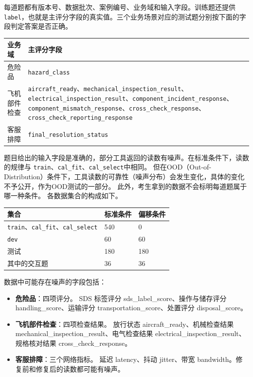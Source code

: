 \documentclass[11pt,a4paper]{article}
\newcounter{none} %
\begin{document}
每道题都有版本号、数据批次、案例编号、业务域和输入字段。训练题还提供\texttt{label}，也就是主评分字段的真实值。三个业务场景对应的测试题分别按下面的字段判定答案是否正确。

{\small{} %
\begin{longtable}[]{@{}
  >{\raggedright\arraybackslash}p{}
  >{\raggedright\arraybackslash}p{}@{}}
\toprule\noalign{}
\begin{minipage}[b]{\linewidth}\raggedright
业务域
\end{minipage} & \begin{minipage}[b]{\linewidth}\raggedright
主评分字段
\end{minipage} \\
\midrule\noalign{}
\endhead
\bottomrule\noalign{}
\endlastfoot
危险品 & \texttt{hazard\_class} \\
飞机部件检查 &
\texttt{aircraft\_ready}、\texttt{mechanical\_inspection\_result}、\texttt{electrical\_inspection\_result}、\texttt{component\_incident\_response}、\texttt{component\_mismatch\_response}、\texttt{cross\_check\_response}、\texttt{cross\_check\_reporting\_response} \\
客服排障 & \texttt{final\_resolution\_status} \\
\end{longtable}
}

题目给出的输入字段是准确的，部分工具返回的读数有噪声。在标准条件下，读数的规律与
\texttt{train}、\texttt{cal\_fit}、\texttt{cal\_select}中相同。
但在OOD（Out-of-Distribution）条件下，工具读数的可靠性（噪声分布）会发生变化，具体的变化不予公开，作为OOD测试的一部分。
此外，考生拿到的数据不会标明每道题属于哪一种条件。
各数据集合的构成如下。

{\small{} %
\begin{longtable}[]{@{}lll@{}}
\toprule\noalign{}
集合 & 标准条件 & 偏移条件 \\
\midrule\noalign{}
\endhead
\bottomrule\noalign{}
\endlastfoot
\texttt{train}、\texttt{cal\_fit}、\texttt{cal\_select} & 540 & 0 \\
\texttt{dev} & 60 & 60 \\
测试 & 180 & 180 \\
其中的交互题 & 36 & 36 \\
\end{longtable}
}

数据中可能存在噪声的字段包括：
\begin{itemize}
\item \textbf{危险品}：四项评分。 SDS 标签评分 sds\_label\_score、操作与储存评分 handling\_score、运输评分 transportation\_score、处置评分 disposal\_score。
\item \textbf{飞机部件检查}：四项检查结果。 放行状态 aircraft\_ready、机械检查结果 mechanical\_inspection\_result、电气检查结果 electrical\_inspection\_result、规格核对结果 cross\_check\_response。
\item \textbf{客服排障}：三个网络指标。 延迟 latency、抖动 jitter、带宽 bandwidth。修复前和修复后的读数都可能有噪声。
\end{itemize}
\end{document}
